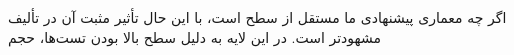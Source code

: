 اگر چه معماری پیشنهادی ما مستقل از سطح  است، با این حال تأثیر مثبت آن در تألیف  مشهودتر است. در این لایه به دلیل سطح بالا بودن تست‌ها، حجم

